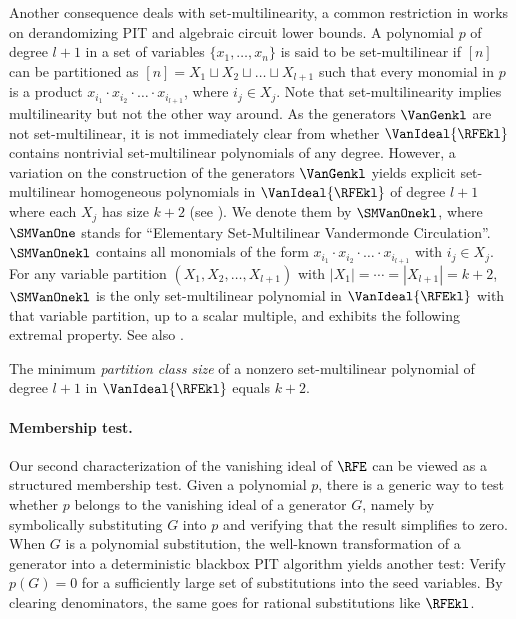 Another consequence deals with set-multilinearity, a common restriction in works on derandomizing PIT
and algebraic circuit lower bounds.
A polynomial $p$ of degree $l+1$ in a set of variables
$\{x_1,\ldots,x_n\}$ is said to be set-multilinear
if $[n]$ can be partitioned as
$[n] = X_1 \sqcup X_2 \sqcup \dots \sqcup X_{l+1}$
such that every monomial in $p$ is a product
$x_{i_1}\cdot x_{i_2} \cdot \dots \cdot x_{i_{l+1}}$,
where $i_j \in X_j$.
Note that set-multilinearity implies multilinearity but not the other
way around.
As the generators $\VanGenkl$ are not set-multilinear,
it is not immediately clear from 
whether $\VanIdeal{\RFEkl}$ contains nontrivial set-multilinear
polynomials of any degree.
However, a variation on the construction of the generators $\VanGenkl$
yields explicit set-multilinear homogeneous polynomials in
\(\VanIdeal{\RFEkl}\) of degree $l+1$ where each \(X_j\) has size $k+2$ (see ).
We denote them by $\SMVanOnekl$, where $\SMVanOne$ stands for
``Elementary Set-Multilinear Vandermonde Circulation''.
$\SMVanOnekl$ contains all monomials of the form
$x_{i_1}\cdot x_{i_2} \cdot \dots \cdot x_{i_{l+1}}$ with $i_j \in X_j$.
For any variable partition $(X_1, X_2, \dots, X_{l+1})$ with
$|X_1| = \cdots = |X_{l+1}| = k+2$,
$\SMVanOnekl$ is the only set-multilinear polynomial in $\VanIdeal{\RFEkl}$
with that variable partition, up to a scalar multiple, and exhibits the following extremal property. See also .
\begin{corollary}
    \label{cor.rfe.partition-class-size}
    The minimum {\em partition class size} of a nonzero set-multilinear
    polynomial of degree $l+1$ in $\VanIdeal{\RFEkl}$ equals $k+2$.
\end{corollary}

\paragraph{Membership test.}
Our second characterization of the vanishing ideal of $\RFE$ can be viewed as
a structured membership test.
Given a polynomial \(p\),
there is a generic way to test whether \(p\) belongs to the
vanishing ideal of a generator $G$,
namely by symbolically substituting \(G\) into \(p\) and verifying that the
result simplifies to zero.
When $G$ is a polynomial substitution,
the well-known transformation of a generator into a deterministic blackbox PIT
algorithm 
yields another test:
Verify \(p(G)=0\) for a sufficiently large set of substitutions into the seed
variables.
By clearing denominators,
the same goes for rational substitutions like $\RFEkl$.

